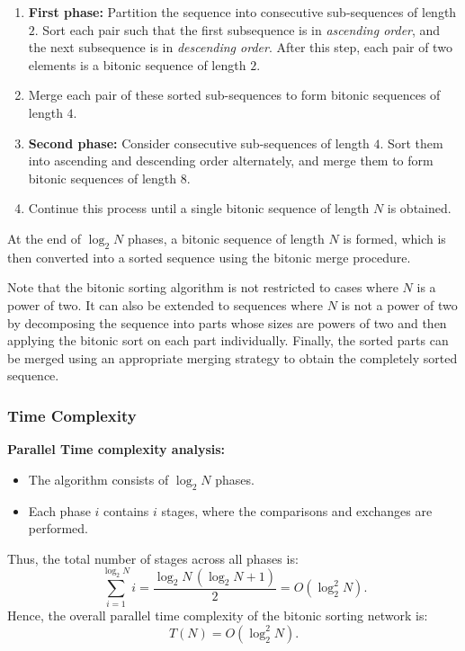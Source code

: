 \documentclass[12pt]{book}
\begin{document}
\begin{enumerate}
    \item \textbf{First phase:} Partition the sequence into consecutive sub-sequences of length $2$. Sort each pair such that the first subsequence is in \emph{ascending order}, and the next subsequence is in \emph{descending order}. After this step, each pair of two elements is a bitonic sequence of length $2$.
    \item Merge each pair of these sorted sub-sequences to form bitonic sequences of length $4$.
    \item \textbf{Second phase:} Consider consecutive sub-sequences of length $4$. Sort them into ascending and descending order alternately, and merge them to form bitonic sequences of length $8$.
    \item Continue this process until a single bitonic sequence of length $N$ is obtained.
\end{enumerate}

At the end of $\log_2 N$ phases, a bitonic sequence of length $N$ is formed, which is then converted into a sorted sequence using the bitonic merge procedure.


Note that the bitonic sorting algorithm is not restricted to cases where $N$ is a power of two. 
It can also be extended to sequences where $N$ is not a power of two by decomposing the sequence 
into parts whose sizes are powers of two and then applying the bitonic sort on each part individually. 
Finally, the sorted parts can be merged using an appropriate merging strategy to obtain the 
completely sorted sequence.

\subsubsection{Time Complexity}

\medskip
\noindent
\textbf{Parallel Time complexity analysis:}
\begin{itemize}
    \item The algorithm consists of $\log_2 N$ phases.
    \item Each phase $i$ contains $i$ stages, where the comparisons and exchanges are performed.
\end{itemize}

Thus, the total number of stages across all phases is:
\[
\sum_{i=1}^{\log_2 N} i = \frac{\log_2 N \, (\log_2 N + 1)}{2} = O(\log_2^2 N).
\]
Hence, the overall parallel time complexity of the bitonic sorting network is:
\[
T(N) = O(\log_2^2 N).
\]
\end{document}
